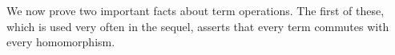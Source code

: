We now prove two important facts about term operations. The first of
these, which is used very often in the sequel, asserts that every term
commutes with every homomorphism.
\ccpad
\begin{code}%
\>[0]\AgdaSpace{}%
\AgdaModule{\AgdaUnderscore{}}\AgdaSpace{}%
\AgdaSymbol{\{}\AgdaSpace{}%
\AgdaSpace{}%
\AgdaSpace{}%
\AgdaSymbol{:}\AgdaSpace{}%
\AgdaSymbol{\}\{}\AgdaSpace{}%
\AgdaSymbol{:}\AgdaSpace{}%
\AgdaSpace{}%
\AgdaSymbol{\}}\AgdaSpace{}%
\<%
\\
%
\\[\AgdaEmptyExtraSkip]%
\>[0][@{}l@{\AgdaIndent{0}}]%
\>[1]\AgdaSpace{}%
\AgdaSymbol{:}%
\>[580I]\AgdaSymbol{\{}\AgdaSpace{}%
\AgdaSymbol{:}\AgdaSpace{}%
\AgdaSpace{}%
\AgdaSpace{}%
\AgdaSymbol{\}}\AgdaSpace{}%
\AgdaSymbol{(}\AgdaSpace{}%
\AgdaSymbol{:}\AgdaSpace{}%
\AgdaSpace{}%
\AgdaSpace{}%
\AgdaSymbol{)}\<%
\\
\>[.][@{}l@{}]\<[580I]%
\>[17]\AgdaSymbol{(}\AgdaSpace{}%
\AgdaSymbol{:}\AgdaSpace{}%
\AgdaSpace{}%
\AgdaSpace{}%
\AgdaSymbol{)}\AgdaSpace{}%
\AgdaSymbol{(}\AgdaSpace{}%
\AgdaSymbol{:}\AgdaSpace{}%
\AgdaSpace{}%
\AgdaSymbol{)}\AgdaSpace{}%
\AgdaSymbol{(}\AgdaSpace{}%
\AgdaSymbol{:}\AgdaSpace{}%
\AgdaSpace{}%
\AgdaSpace{}%
\AgdaSpace{}%
\AgdaSpace{}%
\AgdaSymbol{)}\<%
\\
%
\>[17]\AgdaComment{-----------------------------------------}\<%
\\
\>[1][@{}l@{\AgdaIndent{0}}]%
\>[2]%
\>[17]\AgdaSpace{}%
\AgdaSpace{}%
\AgdaSpace{}%
\AgdaSymbol{((}\AgdaSpace{}%
\AgdaSpace{}%
\AgdaSymbol{)}\AgdaSpace{}%
\AgdaSymbol{)}\AgdaSpace{}%
\AgdaSpace{}%
\AgdaSymbol{(}\AgdaSpace{}%
\AgdaSpace{}%
\AgdaSymbol{)}\AgdaSpace{}%
\AgdaSymbol{(}\AgdaSpace{}%
\AgdaSpace{}%
\AgdaSpace{}%

\end{code}
